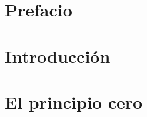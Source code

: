 \documentclass[11pt,fleqn,spanish]{book} %
\begin{document}
\pagestyle{empty} %

\tableofcontents %


\pagestyle{fancy} %



\chapter*{Prefacio}



\chapter{Introducción}


\chapter{El principio cero}





\end{document}

